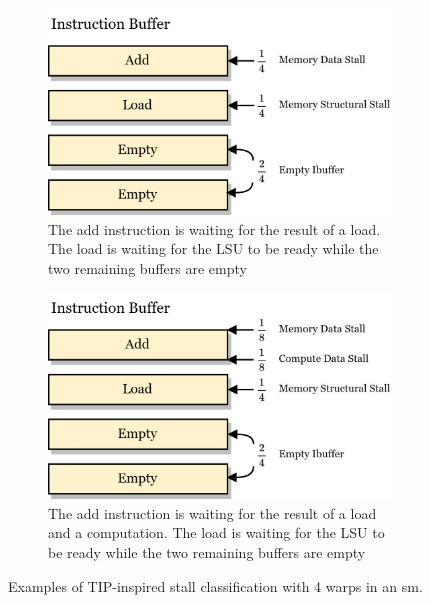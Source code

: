 \begin{figure}
     \centering
     \begin{subfigure}[t]{0.45\textwidth}
         \centering
         \includegraphics[width=\textwidth]{figures/proportional-stall-ex1.png}
         \caption{The add instruction is waiting for the result of a load. The load is waiting for the LSU to be ready while the two remaining buffers are empty}
         \label{fig:prop_stall_1}
     \end{subfigure}
     \hfill
     \begin{subfigure}[t]{0.45\textwidth}
         \centering
         \includegraphics[width=\textwidth]{figures/proportional-stall-ex2.png}
         \caption{The add instruction is waiting for the result of a load and a computation. The load is waiting for the LSU to be ready while the two remaining buffers are empty}
         \label{fig:prop_stall_2}
     \end{subfigure}
        \caption{Examples of TIP-inspired stall classification with 4 warps in an \acrshort{sm}.}
        \label{fig:lrr-gto}
\end{figure}

